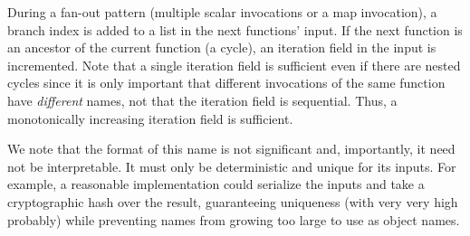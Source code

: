 During a fan-out pattern (multiple scalar invocations or a map invocation), a
branch index is added to a list in the next functions' input. If the next
function is an ancestor of the current function (a cycle), an iteration field in
the input is incremented. Note that a single iteration field is sufficient even
if there are nested cycles since it is only important that different invocations
of the same function have \emph{different} names, not that the iteration field
is sequential. Thus, a monotonically increasing iteration field is sufficient.

We note that the format of this name is not significant and, importantly, it
need not be interpretable. It must only be deterministic and unique for its
inputs. For example, a reasonable implementation could serialize the inputs and
take a cryptographic hash over the result, guaranteeing uniqueness (with very
very high probably) while preventing names from growing too large to use as
object names.
